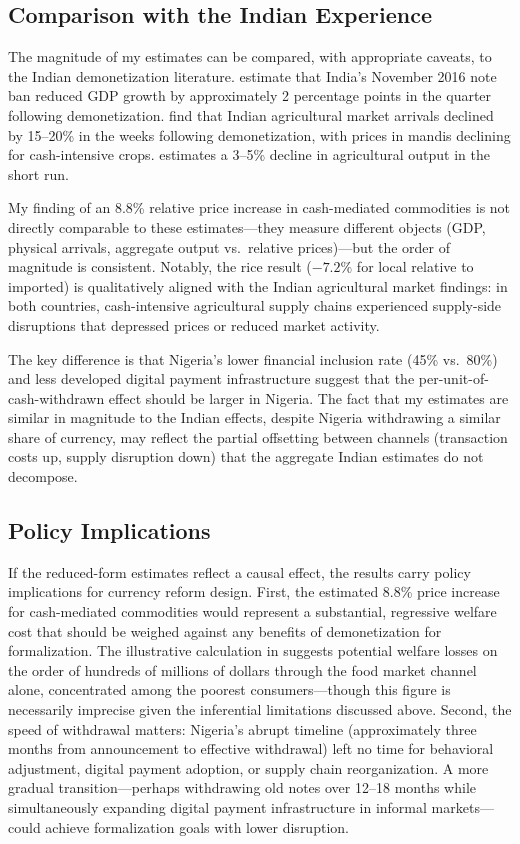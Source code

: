 \documentclass[12pt]{article}
\begin{document}
\subsection{Comparison with the Indian Experience}

The magnitude of my estimates can be compared, with appropriate caveats, to the Indian demonetization literature. \citet{chodorow-reich2020} estimate that India's November 2016 note ban reduced GDP growth by approximately 2 percentage points in the quarter following demonetization. \citet{aggarwal2022demonetization} find that Indian agricultural market arrivals declined by 15--20\% in the weeks following demonetization, with prices in mandis declining for cash-intensive crops. \citet{das2020} estimates a 3--5\% decline in agricultural output in the short run.

My finding of an 8.8\% relative price increase in cash-mediated commodities is not directly comparable to these estimates---they measure different objects (GDP, physical arrivals, aggregate output vs.\ relative prices)---but the order of magnitude is consistent. Notably, the rice result ($-7.2\%$ for local relative to imported) is qualitatively aligned with the Indian agricultural market findings: in both countries, cash-intensive agricultural supply chains experienced supply-side disruptions that depressed prices or reduced market activity.

The key difference is that Nigeria's lower financial inclusion rate (45\% vs.\ 80\%) and less developed digital payment infrastructure suggest that the per-unit-of-cash-withdrawn effect should be larger in Nigeria. The fact that my estimates are similar in magnitude to the Indian effects, despite Nigeria withdrawing a similar share of currency, may reflect the partial offsetting between channels (transaction costs up, supply disruption down) that the aggregate Indian estimates do not decompose.

\subsection{Policy Implications}

If the reduced-form estimates reflect a causal effect, the results carry policy implications for currency reform design. First, the estimated 8.8\% price increase for cash-mediated commodities would represent a substantial, regressive welfare cost that should be weighed against any benefits of demonetization for formalization. The illustrative calculation in  suggests potential welfare losses on the order of hundreds of millions of dollars through the food market channel alone, concentrated among the poorest consumers---though this figure is necessarily imprecise given the inferential limitations discussed above. Second, the speed of withdrawal matters: Nigeria's abrupt timeline (approximately three months from announcement to effective withdrawal) left no time for behavioral adjustment, digital payment adoption, or supply chain reorganization. A more gradual transition---perhaps withdrawing old notes over 12--18 months while simultaneously expanding digital payment infrastructure in informal markets---could achieve formalization goals with lower disruption.
\end{document}

